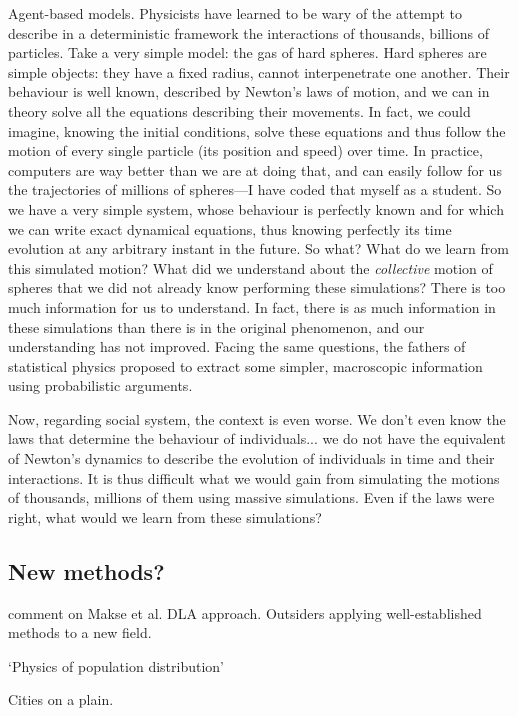 Agent-based models. Physicists have learned to be wary of the attempt to
describe in a deterministic framework the interactions of thousands, billions of
particles. Take a very simple model: the gas of hard spheres. Hard spheres are
simple objects: they have a fixed radius, cannot interpenetrate one another.
Their behaviour is well known, described by Newton's laws of motion, and we can
in theory solve all the equations describing their movements. In fact, we could
imagine, knowing the initial conditions, solve these equations and thus follow
the motion of every single particle (its position and speed) over time. In
practice, computers are way better than we are at doing that, and can easily follow for
us the trajectories of millions of spheres---I have coded that myself as a
student. So we have a very simple system, whose behaviour is perfectly known and
for which we can write exact dynamical equations, thus knowing perfectly its
time evolution at any arbitrary instant in the future. So what? What do we learn
from this simulated motion? What did we understand about the \emph{collective}
motion of spheres that we did not already know performing these simulations?
There is too much information for us to understand. In fact, there is as much
information in these simulations than there is in the original phenomenon, and
our understanding has not improved.
Facing the same questions, the fathers of statistical physics proposed to
extract some simpler, macroscopic information using probabilistic arguments.

Now, regarding social system, the context is even worse. We don't even know the
laws that determine the behaviour of individuals... we do not have the
equivalent of Newton's dynamics to describe the evolution of individuals in time
and their interactions. It is thus difficult what we would gain from simulating
the motions of thousands, millions of them using massive simulations. Even if
the laws were right, what would we learn from these simulations?

    \subsection{New methods?}
    \label{sub:new_methods}

\cite{Batty:1995} comment on Makse et al. DLA approach.
Outsiders applying well-established methods to a new field.

\cite{Stewart:1959} `Physics of population distribution'

\cite{Glass:1971} Cities on a plain.

